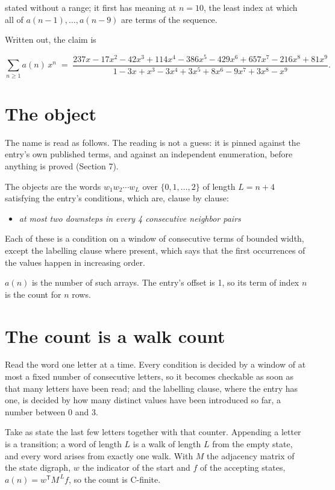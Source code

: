 \documentclass[11pt]{article}
\theoremstyle{definition}
\begin{document}
stated without a range; it first has meaning at $n = 10$, the least index at which all of $a(n-1),\dots,a(n-9)$ are terms of the sequence.

Written out, the claim is

\[\sum_{n \ge 1} a(n)\,x^n \;=\; \frac{237x - 17x^{2} - 42x^{3} + 114x^{4} - 386x^{5} - 429x^{6} + 657x^{7} - 216x^{8} + 81x^{9}}{1 - 3x + x^{3} - 3x^{4} + 3x^{5} + 8x^{6} - 9x^{7} + 3x^{8} - x^{9}}.\]

\section{The object}

The name is read as follows. The reading is not a guess: it is pinned against the entry's own published terms, and against an independent enumeration, before anything is proved (Section 7).

The objects are the words $w_1 w_2 \cdots w_L$ over $\{0,1,\dots,2\}$ of length $L = n + 4$ satisfying the entry's conditions, which are, clause by clause:

\begin{itemize}

\item {\itshape at most two downsteps in every 4 consecutive neighbor pairs}

\end{itemize}

Each of these is a condition on a window of consecutive terms of bounded width, except the labelling clause where present, which says that the first occurrences of the values happen in increasing order.

$a(n)$ is the number of such arrays. The entry's offset is 1, so its term of index $n$ is the count for $n$ rows.

\section{The count is a walk count}

Read the word one letter at a time. Every condition is decided by a window of at most a fixed number of consecutive letters, so it becomes checkable as soon as that many letters have been read; and the labelling clause, where the entry has one, is decided by how many distinct values have been introduced so far, a number between $0$ and 3.

Take as state the last few letters together with that counter. Appending a letter is a transition; a word of length $L$ is a walk of length $L$ from the empty state, and every word arises from exactly one walk. With $M$ the adjacency matrix of the state digraph, $w$ the indicator of the start and $f$ of the accepting states, $a(n) = w^{\mathsf T}M^{\,L}f$, so the count is C-finite.
\end{document}
